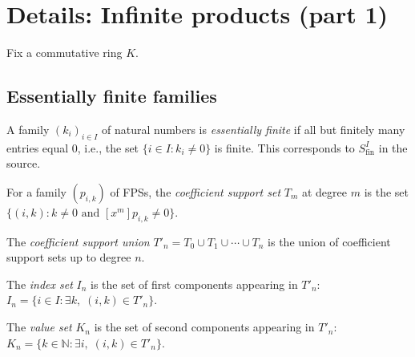 \section{Details: Infinite products (part 1)}
\label{sec.details.gf.prod}

Fix a commutative ring $K$.

\subsection{Essentially finite families}

\begin{definition}
\label{def.fps.infprod.essFinite}
\leanhelper
\leanok
A family $(k_i)_{i \in I}$ of natural numbers is \emph{essentially finite}
if all but finitely many entries equal $0$, i.e., the set $\{i \in I : k_i \neq 0\}$
is finite. This corresponds to $S^I_{\mathrm{fin}}$ in the source.
\end{definition}

\begin{definition}
\label{def.fps.infprod.coeffSupportSet}
\leanhelper
\leanok
For a family $(p_{i,k})$ of FPSs, the \emph{coefficient support set} $T_m$ at degree $m$
is the set $\{(i,k) : k \neq 0 \text{ and } [x^m] p_{i,k} \neq 0\}$.
\end{definition}

\begin{definition}
\label{def.fps.infprod.coeffSupportSetUnion}
\leanhelper
\leanok
The \emph{coefficient support union} $T'_n = T_0 \cup T_1 \cup \cdots \cup T_n$
is the union of coefficient support sets up to degree $n$.
\end{definition}

\begin{definition}
\label{def.fps.infprod.indexSetIn}
\leanhelper
\leanok
The \emph{index set} $I_n$ is the set of first components appearing in $T'_n$:
$I_n = \{i \in I : \exists k,\; (i,k) \in T'_n\}$.
\end{definition}

\begin{definition}
\label{def.fps.infprod.valueSetKn}
\leanhelper
\leanok
The \emph{value set} $K_n$ is the set of second components appearing in $T'_n$:
$K_n = \{k \in \mathbb{N} : \exists i,\; (i,k) \in T'_n\}$.
\end{definition}

